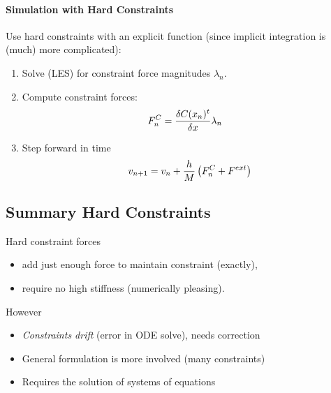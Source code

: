 \begin{multicols}{2}
\paragraph{Simulation with Hard Constraints} Use hard constraints with an explicit function (since implicit integration is (much) more complicated):
\begin{enumerate}
	\item Solve (LES) for constraint force magnitudes $\lambda_n$.
	\item Compute constraint forces:
		\begin{align*}
			F_n^C &= {\delta C(x_n)^t \over \delta x}\lambda_n
		\end{align*}
	\item Step forward in time 
		\begin{align*}
			v_{n+1} = v_n + {h\over M} \left(F_n^C + F^{ext}\right)
		\end{align*}
\end{enumerate}

\subsection{Summary Hard Constraints}
Hard constraint forces
\begin{itemize}
	\item add just enough force to maintain constraint (exactly),
	\item require no high stiffness (numerically pleasing).
\end{itemize}
However
\begin{itemize}
	\item \emph{Constraints drift} (error in ODE solve), needs correction
	\item General formulation is more involved (many constraints)
	\item Requires the solution of systems of equations
\end{itemize}





\end{multicols}


